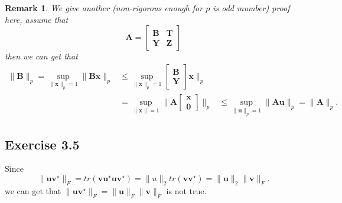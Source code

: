 \documentclass{article}
\newtheorem*{remark}{Remark}
\begin{document}
        \begin{remark}
            We give another (non-rigorous enough for $p$ is odd mumber) proof here, assume that 
            $$
            \bm{A} = \begin{bmatrix}
                \bm{B} & \bm{T} \\
                \bm{Y} & \bm{Z}
            \end{bmatrix}
            $$
            then we can get that 
            $$
            \begin{aligned}
           \| \bm{B} \|_p = \sup_{\| \bm{x} \|_p = 1} \| \bm{Bx} \|_p & \leq \sup_{\| \bm{x} \|_p = 1} \begin{bmatrix}
            \bm{B} \\ \bm{Y}
           \end{bmatrix} \bm{x} \|_p \\ 
           & = \sup_{\| \bm{x} \| = 1} \| \bm{A} \begin{bmatrix}
            \bm{x} \\ \bm{0}
           \end{bmatrix}\|_p & \leq \sup_{\| \bm{u}\|_p = 1} \| \bm{Au}\|_{p} = \| \bm{A} \|_p.
            \end{aligned}
            $$
        \end{remark}  

\subsection{Exercise 3.5} 
        Since
        $$
       \| \bm{u} \bm{v}^{\star}\|_F = tr (\bm{v} \bm{u}^{\star} \bm{u} \bm{v}^{\star}) = \| u\|_2 tr(\bm{v} \bm{v}^{\star}) = \| \bm{u}\|_2 \| \bm{v} \|_F.
        $$
        we can get that $\| \bm{u} \bm{v}^{\star}\|_F = \| \bm{u}\|_F \| \bm{v} \|_F$ is not true.
\end{document}
